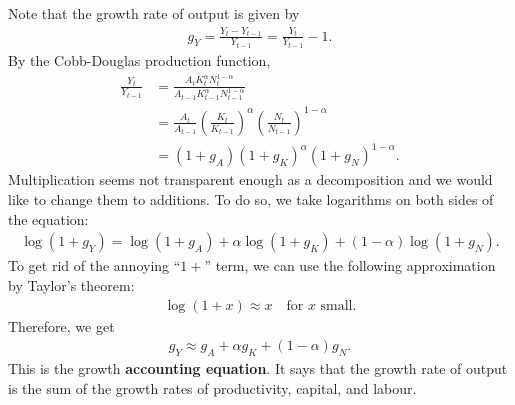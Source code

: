 \documentclass{book}
\theoremstyle{definition}
\theoremstyle{plain}
\begin{document}
Note that the growth rate of output is given by
\begin{align}\label{eq:growth_rate_output}
    g_{Y} = \frac{Y_t - Y_{t-1}}{Y_{t-1}} = \frac{Y_t}{Y_{t-1}} - 1.
\end{align}
By the Cobb-Douglas production function, 
\begin{align*}
    \frac{Y_t}{Y_{t-1}} &= \frac{A_t K_t^{\alpha} N_t^{1-\alpha}}{A_{t-1} K_{t-1}^{\alpha} N_{t-1}^{1-\alpha}} \\
    & = \frac{A_t}{A_{t-1}} \left(\frac{K_t}{K_{t-1}}\right)^{\alpha} \left(\frac{N_t}{N_{t-1}}\right)^{1-\alpha}\\
    &= (1+g_A) (1+g_K)^{\alpha} (1+g_N)^{1-\alpha}.
\end{align*}
Multiplication seems not transparent enough as a decomposition and we would like to change them to additions. To do so, we {\color{red} take logarithms} on both sides of the equation:
\begin{align*}
    \log (1+g_Y) = \log (1+g_A) + \alpha \log (1+g_K) + (1-\alpha) \log (1+g_N).
\end{align*}
To get rid of the annoying ``$1+$'' term, we can use the following approximation by {\color{red}Taylor's theorem}:
\begin{align*}
    \log (1+x) \approx x \quad \text{for } x \text{ small}.
\end{align*}
Therefore, we get
\begin{align*}
    g_Y \approx g_A + \alpha g_K + (1-\alpha) g_N.
\end{align*}
This is the growth \textbf{accounting equation}. It says that the growth rate of output is the sum of the growth rates of productivity, capital, and labour.
\end{document}
